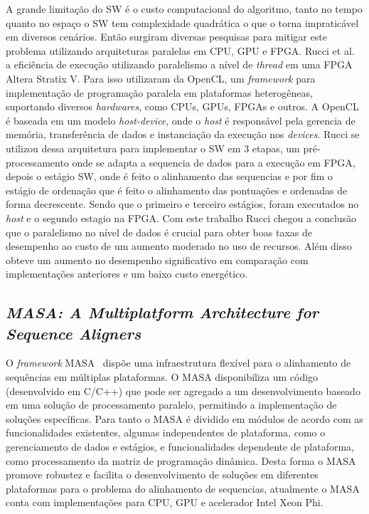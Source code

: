 \documentclass[12pt, a4paper]{article}
\numberwithin{table}{section}
\begin{document}
A grande limitação do SW é o custo computacional do algoritmo, tanto no tempo
quanto no espaço o SW tem complexidade quadrática o que o torna impraticável em
diversos cenários. Então surgiram diversas pesquisas para mitigar este problema
utilizando arquiteturas paralelas em CPU, GPU e FPGA. 
Rucci et al.~\cite{7345650} a eficiência de execução utilizando paralelismo a 
nível de \textit{thread} em uma FPGA Altera Stratix V. Para isso utilizaram da 
OpenCL, um \textit{framework} para implementação de programação paralela em
plataformas heterogêneas, suportando diversos \textit{hardwares}, como CPUs,
GPUs, FPGAs e outros. A OpenCL é baseada em um modelo \textit{host-device}, 
onde o \textit{host} é responsável pela gerencia de memória, transferência de dados e 
instanciação da execução nos \textit{devices}.
Rucci se utilizou dessa arquitetura para implementar o SW em 3 etapas, um pré-processamento
onde se adapta a sequencia de dados para a execução em FPGA, depois o estágio SW, onde é feito
o alinhamento das sequencias e por fim o estágio de ordenação que é feito o alinhamento 
das pontuações e ordenadas de forma decrescente. Sendo que o primeiro e terceiro estágios,
foram executados no \textit{host} e o segundo estagio na FPGA.
Com este trabalho Rucci chegou a conclusão que o paralelismo no nível de dados é 
crucial para obter boas taxas de desempenho ao custo de um aumento moderado no uso
de recursos. Além disso obteve um aumento no desempenho significativo em comparação
com implementações anteriores e um baixo custo energético.

\subsection {\textit{MASA: A Multiplatform Architecture for Sequence Aligners}}

O \textit{framework} MASA~\cite{DeO.Sandes:2016:MMA:2888415.2858656} 
dispõe uma infraestrutura flexível para o alinhamento de 
sequências em múltiplas plataformas. O MASA disponibiliza um 
código (desenvolvido em C/C++) que pode ser agregado a um desenvolvimento 
baseado em uma solução de processamento paralelo, permitindo a implementação
de soluções específicas. Para tanto o MASA é dividido em módulos de acordo 
com as funcionalidades existentes, algumas independentes de plataforma, como
o gerenciamento de dados e estágios, e funcionalidades dependente de plataforma, 
como processamento da matriz de programação dinâmica. Desta forma o MASA promove 
robustez e facilita o desenvolvimento de soluções em diferentes plataformas 
para o problema do alinhamento de sequencias, atualmente o MASA conta com 
implementações para CPU, GPU e acelerador Intel Xeon Phi.
\end{document}

